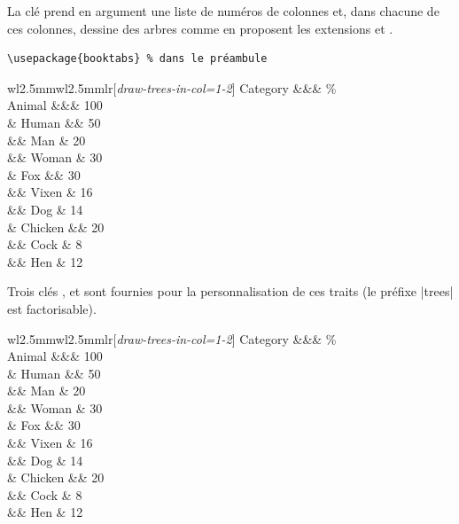 \documentclass[dvipsnames]{article}
\begin{document}

La clé  prend en argument une liste de numéros de colonnes
et, dans chacune de ces colonnes, dessine des arbres comme en proposent
les extensions  et .

\medskip
\begin{Verbatim}[formatcom=\footnotesize \color{gray}]
\usepackage{booktabs} % dans le préambule
\end{Verbatim}

\begin{Code}
\renewcommand{\arraystretch}{1.3}
\begin{NiceTabular}{w{l}{2.5mm}w{l}{2.5mm}lr}[\emph{draw-trees-in-col=1-2}]
\toprule
  Category &&&  \% \\
\midrule
  Animal   &&& 100 \\
  & Human   &&  50 \\
  && Man     &  20 \\
  && Woman   &  30 \\
  & Fox     &&  30 \\
  && Vixen   &  16 \\
  && Dog     &  14 \\
  & Chicken &&  20 \\
  && Cock    &   8 \\
  && Hen     &  12 \\
\bottomrule
\end{NiceTabular}
\end{Code}



\bigskip
Trois clés ,  et
 sont fournies pour la personnalisation de ces traits
(le préfixe |trees| est factorisable).

\medskip
\begin{Code}
\renewcommand{\arraystretch}{1.3}
\begin{NiceTabular}{w{l}{2.5mm}w{l}{2.5mm}lr}[\emph{draw-trees-in-col=1-2}]
\toprule
  Category &&&  \% \\
\midrule
  Animal   &&& 100 \\
  & Human   &&  50 \\
  && Man     &  20 \\
  && Woman   &  30 \\
  & Fox     &&  30 \\
  && Vixen   &  16 \\
  && Dog     &  14 \\
  & Chicken &&  20 \\
  && Cock    &   8 \\
  && Hen     &  12 \\
\bottomrule
\end{NiceTabular}
\end{Code}
\end{document}

